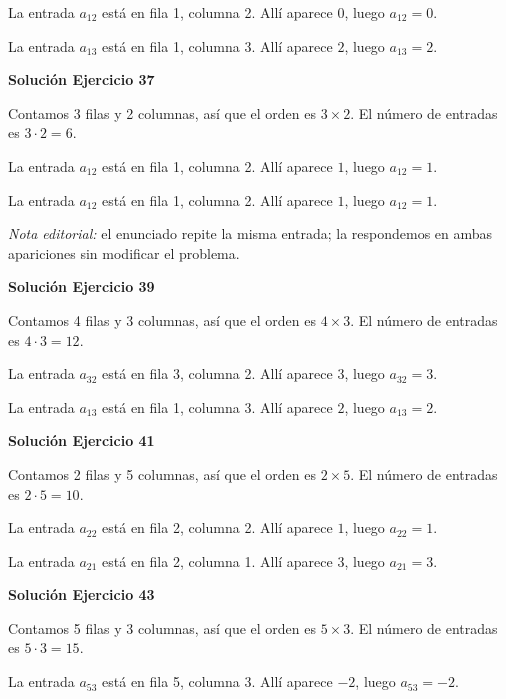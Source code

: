 \documentclass[12pt]{article}
\begin{document}
La entrada $a_{12}$ está en fila 1, columna 2. Allí aparece $0$, luego $\boxed{a_{12}=0}$.

La entrada $a_{13}$ está en fila 1, columna 3. Allí aparece $2$, luego $\boxed{a_{13}=2}$.


\par\bigskip\noindent\textbf{Solución Ejercicio 37}\par\nobreak
Contamos 3 filas y 2 columnas, así que el orden es $3\times2$. El número de entradas es $3\cdot 2=6$.

La entrada $a_{12}$ está en fila 1, columna 2. Allí aparece $1$, luego $\boxed{a_{12}=1}$.

La entrada $a_{12}$ está en fila 1, columna 2. Allí aparece $1$, luego $\boxed{a_{12}=1}$.

\emph{Nota editorial:} el enunciado repite la misma entrada; la respondemos en ambas apariciones sin modificar el problema.


\par\bigskip\noindent\textbf{Solución Ejercicio 39}\par\nobreak
Contamos 4 filas y 3 columnas, así que el orden es $4\times3$. El número de entradas es $4\cdot 3=12$.

La entrada $a_{32}$ está en fila 3, columna 2. Allí aparece $3$, luego $\boxed{a_{32}=3}$.

La entrada $a_{13}$ está en fila 1, columna 3. Allí aparece $2$, luego $\boxed{a_{13}=2}$.


\par\bigskip\noindent\textbf{Solución Ejercicio 41}\par\nobreak
Contamos 2 filas y 5 columnas, así que el orden es $2\times5$. El número de entradas es $2\cdot 5=10$.

La entrada $a_{22}$ está en fila 2, columna 2. Allí aparece $1$, luego $\boxed{a_{22}=1}$.

La entrada $a_{21}$ está en fila 2, columna 1. Allí aparece $3$, luego $\boxed{a_{21}=3}$.


\par\bigskip\noindent\textbf{Solución Ejercicio 43}\par\nobreak
Contamos 5 filas y 3 columnas, así que el orden es $5\times3$. El número de entradas es $5\cdot 3=15$.

La entrada $a_{53}$ está en fila 5, columna 3. Allí aparece $-2$, luego $\boxed{a_{53}=-2}$.
\end{document}
